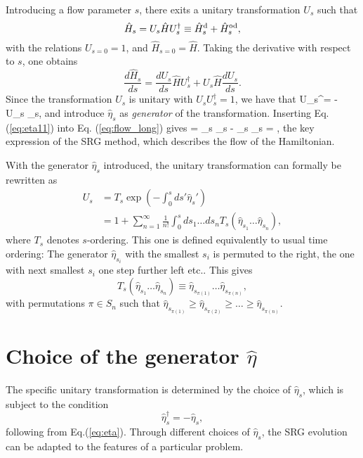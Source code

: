  Introducing a flow parameter $s$, there exits a unitary transformation $U_s$ such that
\begin{equation}
 \hat{H}_s = U_s \hat{H} U_s^\dagger \equiv \hat{H}^{\rm d}_s + \hat{H}^{\rm od}_s,
\end{equation}
with the relations $U_{s=0} = 1$, and $\hat{H}_{s= 0} = \hat{H}$. Taking the derivative with respect to $s$, one obtains 
\begin{equation}
 \frac{d \hat{H}_s}{ds} = \frac{d U_s}{ds}\hat{H} U_s^\dagger + U_s \hat{H} \frac{d U_s}{ds}.
\label{eq:flow_long}
\end{equation}
Since the transformation $U_s$ is unitary with $U_s U_s^\dagger = 1$, we have that
\be
  U_s^\dagger = - U_s  \equiv \hat{\eta}_s,
\label{eq:eta11}
\ee
and introduce $\hat{\eta}_s$ as \textit{generator} of the transformation. Inserting Eq.(\ref{eq:eta11}) into Eq. (\ref{eq:flow_long}) gives
\be
{} = \hat{\eta}_s _s - _s \hat{\eta}_s = ,
\label{eq:flow_short}
\ee
the key expression of the SRG method, which describes the flow of the Hamiltonian.

With the generator $\hat{\eta}_s$ introduced, the unitary transformation can formally be rewritten as \cite{kehrein2006flow}
\begin{align*}
U_s &= T_s \exp \left(-\int_0^s \! ds'\hat{\eta}_s' \right)\\
&= 1 + \sum\limits_{n=1}^\infty\frac{1}{n!}\int_0^s ds_1 \dots ds_n T_s(\hat{\eta}_{s_1}\dots\hat{\eta}_{s_n}),
\end{align*}
where $T_s$ denotes $s$-ordering. This one is defined equivalently to usual time ordering: The generator $\hat{\eta}_{s_i}$ with the smallest $s_i$ is permuted to the right, the one with next smallest $s_i$ one step further left etc.. This gives
\[
T_s(\hat{\eta}_{s_1}\dots\hat{\eta}_{s_n}) \equiv \hat{\eta}_{s_{\pi(1)}}\dots \hat{\eta}_{s_{\pi(n)}},
\]
with permutations $\pi\in S_n$ such that $ \hat{\eta}_{s_{\pi(1)}}\geq \hat{\eta}_{s_{\pi(2)}} \geq \dots \geq \hat{\eta}_{s_{\pi(n)}}$.

\section{Choice of the generator $\hat{\eta}$}
\label{sec:ChoiceEta}

The specific unitary transformation is determined by the choice of $\hat{\eta}_s$, which is subject to the condition 
\[
 \hat{\eta}_s^\dagger = -\hat{\eta}_s,
\]
following from Eq.(\ref{eq:eta}). Through different choices of $\hat{\eta}_s$, the SRG evolution can be adapted to the features of a particular problem.


